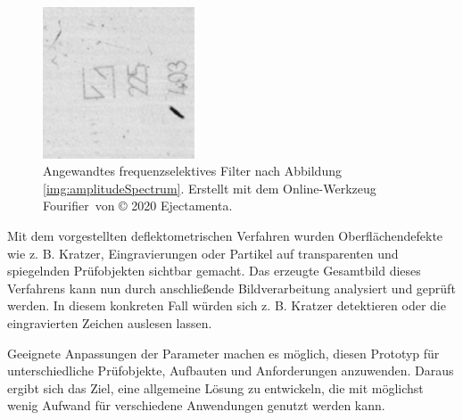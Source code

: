 \begin{figure}[H]
	\centering
	\includegraphics[width=0.4\textwidth]{03_sichtpruefungDurchLichtstreuung/optimierungen/figures/frequencyFiltered}
	\caption[Bild mit angewandtem frequenzselektives Filter]{Angewandtes frequenzselektives Filter nach Abbildung \ref{img:amplitudeSpectrum}. Erstellt mit dem Online-Werkzeug \glqq Fourifier\grqq ~von © 2020 Ejectamenta.\cite{fourierTool}\footnotemark}
	\label{img:frequencyFiltered}
\end{figure}

\noindent
Mit dem vorgestellten deflektometrischen Verfahren wurden Oberflächen\-de\-fekte wie z. B. Kratzer, Eingravierungen oder Partikel auf transparenten und spiegelnden Prüfobjekten sichtbar gemacht.
Das erzeugte Gesamtbild dieses Verfahrens kann nun durch anschließende Bildverarbeitung analysiert und geprüft werden.
In diesem konkreten Fall würden sich z. B. Kratzer detektieren oder die eingravierten Zeichen auslesen lassen.

\p
Geeignete Anpassungen der Parameter machen es möglich, diesen Prototyp für unterschiedliche Prüfobjekte, Aufbauten und Anforderungen anzuwenden.
Daraus ergibt sich das Ziel, eine allgemeine Lösung zu entwickeln, die mit möglichst wenig Aufwand für verschiedene Anwendungen genutzt werden kann.